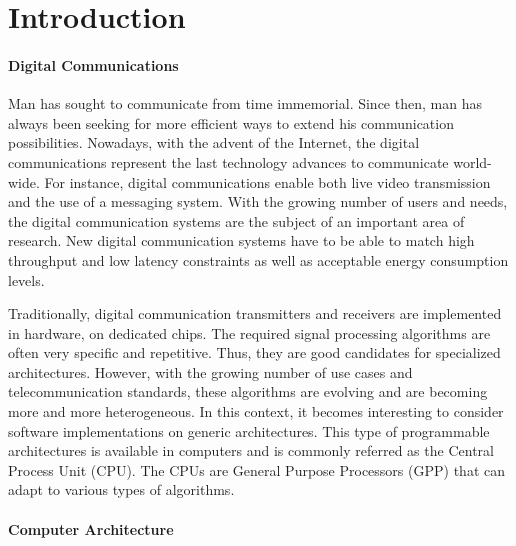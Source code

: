 
\graphicspath{{main/introduction/fig/}}

\chapter*{Introduction}

\subsubsection*{Digital Communications}

Man has sought to communicate from time immemorial. Since then, man has always
been seeking for more efficient ways to extend his communication possibilities.
Nowadays, with the advent of the Internet, the digital communications represent
the last technology advances to communicate world-wide. For instance, digital
communications enable both live video transmission and the use of a messaging
system. With the growing number of users and needs, the digital communication
systems are the subject of an important area of research. New digital
communication systems have to be able to match high throughput and low latency
constraints as well as acceptable energy consumption levels.

Traditionally, digital communication transmitters and receivers are implemented
in hardware, on dedicated chips. The required signal processing algorithms are
often very specific and repetitive. Thus, they are good candidates for
specialized architectures. However, with the growing number of use cases and
telecommunication standards, these algorithms are evolving and are becoming more
and more heterogeneous. In this context, it becomes interesting to consider
software implementations on generic architectures. This type of programmable
architectures is available in computers and is commonly referred as the Central
Process Unit (CPU). The CPUs are General Purpose Processors (GPP) that can adapt
to various types of algorithms.

\subsubsection*{Computer Architecture}

